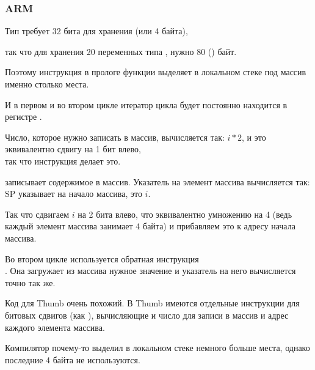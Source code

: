 \subsubsection{ARM}

\myparagraph{\NonOptimizingKeilVI (\ARMMode)}



Тип \Tint требует 32 бита для хранения (или 4 байта),

так что для хранения 20 переменных типа \Tint, нужно 80 () байт.

Поэтому инструкция  
в прологе функции выделяет в локальном стеке под массив именно столько места.

И в первом и во втором цикле итератор цикла  будет постоянно находится в регистре .

Число, которое нужно записать в массив, вычисляется так: $i*2$, и это эквивалентно 
сдвигу на 1 бит влево,\\
так что инструкция  делает это.

 записывает содержимое  в массив.
Указатель на элемент массива вычисляется так: \ac{SP} указывает на начало массива,  это $i$.

Так что сдвигаем $i$ на 2 бита влево, что эквивалентно умножению на 4 
(ведь каждый элемент массива занимает 4 байта) и прибавляем это к адресу начала массива.

Во втором цикле используется обратная инструкция\\
.
Она загружает из массива нужное значение и указатель на него вычисляется точно так же.

\myparagraph{\OptimizingKeilVI (\ThumbMode)}



Код для Thumb очень похожий.
В Thumb имеются отдельные инструкции для битовых сдвигов (как ), 
вычисляющие и число для записи в массив и адрес каждого элемента массива.

Компилятор почему-то выделил в локальном стеке немного больше места, 
однако последние 4 байта не используются.




